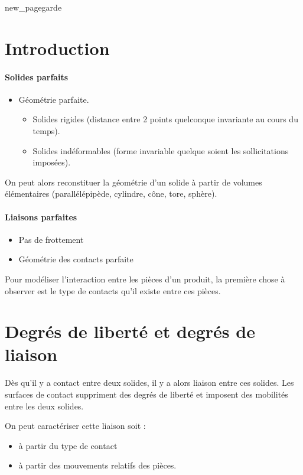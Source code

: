 \documentclass[10pt,fleqn,draft]{article} %
\begin{document}
{new_pagegarde}
\section*{Introduction}
\paragraph{Solides parfaits}
\begin{itemize}
    \item Géométrie parfaite.
    \begin{itemize}
        \item Solides rigides (distance entre 2 points quelconque invariante au cours du temps).
        \item Solides indéformables (forme invariable quelque soient les sollicitations imposées).
    \end{itemize}
\end{itemize}
On peut alors reconstituer la géométrie d'un solide à partir de volumes élémentaires (parallélépipède, cylindre, cône, tore, sphère).

\paragraph{Liaisons parfaites}
\begin{itemize}
    \item Pas de frottement
    \item Géométrie des contacts parfaite
\end{itemize}
Pour modéliser l'interaction entre les pièces d'un produit, la première chose à observer est le type de contacts qu'il existe entre ces pièces.

\section{Degrés de liberté et degrés de liaison}
Dès qu'il y a contact entre deux solides, il y a alors
liaison entre ces solides. Les surfaces de contact suppriment des degrés de liberté et imposent des mobilités entre les deux solides.

On peut caractériser cette liaison soit :
\begin{itemize}
    \item à partir du type de contact
    \item à partir des mouvements relatifs des pièces.
\end{itemize}
\end{document}
